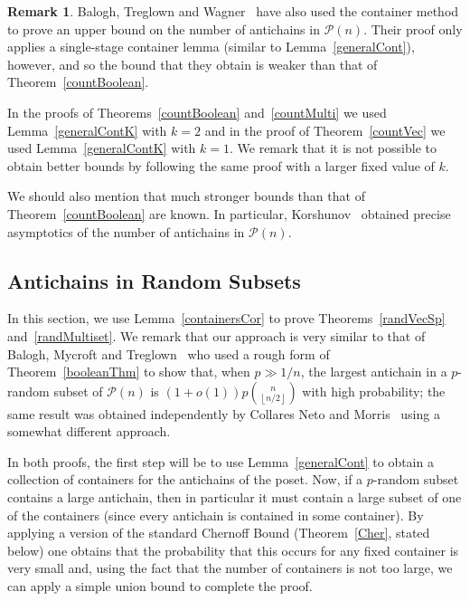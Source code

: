\documentclass[11 pt]{article}
\theoremstyle{definition}
\newtheorem{rem}[equation]{Remark}
\theoremstyle{case}
\numberwithin{equation}{section}
\begin{document}
\begin{rem}
Balogh, Treglown and Wagner~\cite{BaloghWagnerBoolean} have also used the container method to prove an upper bound on the number of antichains in $\mathcal{P}(n)$. Their proof only applies a single-stage container lemma (similar to Lemma~\ref{generalCont}), however, and so the bound that they obtain is weaker than that of Theorem~\ref{countBoolean}. 

In the proofs of Theorems~\ref{countBoolean} and~\ref{countMulti} we used Lemma~\ref{generalContK} with $k=2$ and in the proof of Theorem~\ref{countVec} we used Lemma~\ref{generalContK} with $k=1$. We remark that it is not possible to obtain better bounds by following the same proof with a larger fixed value of $k$.

We should also mention that much stronger bounds than that of Theorem~\ref{countBoolean} are known. In particular, Korshunov~\cite{Korsh} obtained precise asymptotics of the number of antichains in $\mathcal{P}(n)$.
\end{rem}

\subsection{Antichains in Random Subsets}

In this section, we use Lemma~\ref{containersCor} to prove Theorems~\ref{randVecSp} and~\ref{randMultiset}. We remark that our approach is very similar to that of Balogh, Mycroft and Treglown~\cite{RandomSperner} who used a rough form of Theorem~\ref{booleanThm} to show that, when $p\gg 1/n$, the largest antichain in a $p$-random subset of $\mathcal{P}(n)$ is $(1+o(1))p\binom{n}{\left\lfloor n/2\right\rfloor}$ with high probability; the same result was obtained independently by Collares Neto and Morris~\cite{RandomErdos} using a somewhat different approach. 

In both proofs, the first step will be to use Lemma~\ref{generalCont} to obtain a collection of containers for the antichains of the poset. Now, if a $p$-random subset contains a large antichain, then in particular it must contain a large subset of one of the containers (since every antichain is contained in some container). By applying a version of the standard Chernoff Bound (Theorem~\ref{Cher}, stated below) one obtains that the probability that this occurs for any fixed container is very small and, using the fact that the number of containers is not too large, we can apply a simple union bound to complete the proof.
\end{document}
